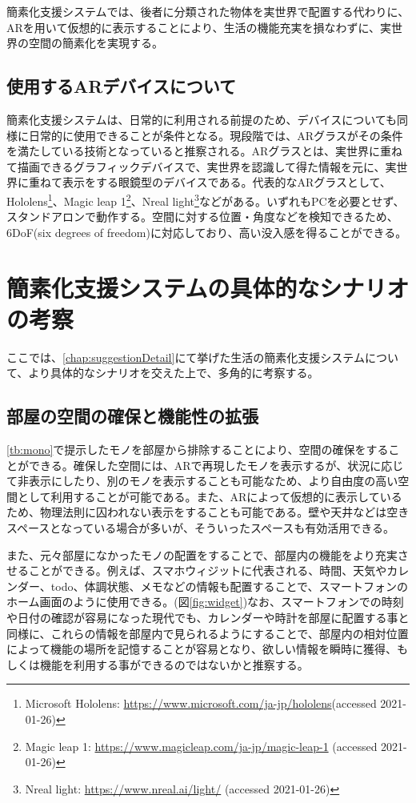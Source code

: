 簡素化支援システムでは、後者に分類された物体を実世界で配置する代わりに、ARを用いて仮想的に表示することにより、生活の機能充実を損なわずに、実世界の空間の簡素化を実現する。

\subsection{使用するARデバイスについて}
\label{chap:ARdevice}

簡素化支援システムは、日常的に利用される前提のため、デバイスについても同様に日常的に使用できることが条件となる。現段階では、ARグラスがその条件を満たしている技術となっていると推察される。ARグラスとは、実世界に重ねて描画できるグラフィックデバイスで、実世界を認識して得た情報を元に、実世界に重ねて表示をする眼鏡型のデバイスである。代表的なARグラスとして、Hololens\footnote{Microsoft Hololens: \url{https://www.microsoft.com/ja-jp/hololens}(accessed 2021-01-26)}、Magic leap 1\footnote{Magic leap 1: \url{https://www.magicleap.com/ja-jp/magic-leap-1} (accessed 2021-01-26)}、Nreal light\footnote{Nreal light: \url{https://www.nreal.ai/light/} (accessed 2021-01-26)}などがある。いずれもPCを必要とせず、スタンドアロンで動作する。空間に対する位置・角度などを検知できるため、6DoF(six degrees of freedom)に対応しており、高い没入感を得ることができる。

\newpage

\section{簡素化支援システムの具体的なシナリオの考察}

ここでは、\ref{chap:suggestionDetail}にて挙げた生活の簡素化支援システムについて、より具体的なシナリオを交えた上で、多角的に考察する。

\subsection{部屋の空間の確保と機能性の拡張}

\ref{tb:mono}で提示したモノを部屋から排除することにより、空間の確保をすることができる。確保した空間には、ARで再現したモノを表示するが、状況に応じて非表示にしたり、別のモノを表示することも可能なため、より自由度の高い空間として利用することが可能である。また、ARによって仮想的に表示しているため、物理法則に囚われない表示をすることも可能である。壁や天井などは空きスペースとなっている場合が多いが、そういったスペースも有効活用できる。

また、元々部屋になかったモノの配置をすることで、部屋内の機能をより充実させることができる。例えば、スマホウィジットに代表される、時間、天気やカレンダー、todo、体調状態、メモなどの情報も配置することで、スマートフォンのホーム画面のように使用できる。(図\ref{fig:widget})なお、スマートフォンでの時刻や日付の確認が容易になった現代でも、カレンダーや時計を部屋に配置する事と同様に、これらの情報を部屋内で見られるようにすることで、部屋内の相対位置によって機能の場所を記憶することが容易となり、欲しい情報を瞬時に獲得、もしくは機能を利用する事ができるのではないかと推察する。

